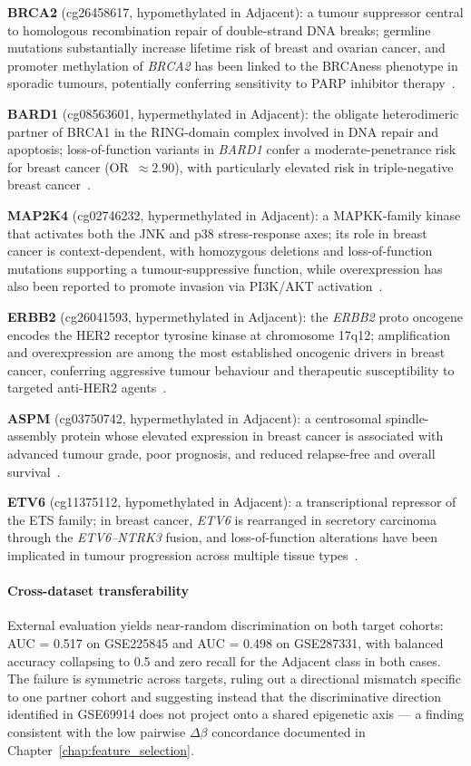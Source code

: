 \textbf{BRCA2} (cg26458617, hypomethylated in Adjacent): a tumour suppressor
central to homologous recombination repair of double-strand DNA breaks;
germline mutations substantially increase lifetime risk of breast and ovarian
cancer, and promoter methylation of \textit{BRCA2} has been linked to the
BRCAness phenotype in sporadic tumours, potentially conferring sensitivity to
PARP inhibitor therapy~\cite{kalachand2024brca}.

\textbf{BARD1} (cg08563601, hypermethylated in Adjacent): the obligate
heterodimeric partner of BRCA1 in the RING-domain complex involved in DNA
repair and apoptosis; loss-of-function variants in \textit{BARD1} confer a
moderate-penetrance risk for breast cancer (OR~$\approx 2.90$), with
particularly elevated risk in triple-negative breast
cancer~\cite{graffeo2022bard1}.

\textbf{MAP2K4} (cg02746232, hypermethylated in Adjacent): a MAPKK-family
kinase that activates both the JNK and p38 stress-response axes; its role in
breast cancer is context-dependent, with homozygous deletions and
loss-of-function mutations supporting a tumour-suppressive function, while
overexpression has also been reported to promote invasion via PI3K/AKT
activation~\cite{liu2019map2k4}.

\textbf{ERBB2} (cg26041593, hypermethylated in Adjacent): the \textit{ERBB2}
proto oncogene encodes the HER2 receptor tyrosine kinase at chromosome 17q12;
amplification and overexpression are among the most established oncogenic
drivers in breast cancer, conferring aggressive tumour behaviour and
therapeutic susceptibility to targeted anti-HER2
agents~\cite{moasser2007her2}.

\textbf{ASPM} (cg03750742, hypermethylated in Adjacent): a centrosomal
spindle-assembly protein whose elevated expression in breast cancer is
associated with advanced tumour grade, poor prognosis, and reduced
relapse-free and overall survival~\cite{tang2019aspm}.

\textbf{ETV6} (cg11375112, hypomethylated in Adjacent): a transcriptional
repressor of the ETS family; in breast cancer, \textit{ETV6} is rearranged in
secretory carcinoma through the \textit{ETV6--NTRK3} fusion, and
loss-of-function alterations have been implicated in tumour progression across
multiple tissue types~\cite{tognon2002etv6}.

\paragraph{Cross-dataset transferability}
External evaluation yields near-random discrimination on both target cohorts:
AUC = 0.517 on GSE225845 and AUC = 0.498 on GSE287331, with balanced
accuracy collapsing to 0.5 and zero recall for the Adjacent class in both
cases. The failure is symmetric across targets, ruling out a directional
mismatch specific to one partner cohort and suggesting instead that the
discriminative direction identified in GSE69914 does not project onto a
shared epigenetic axis --- a finding consistent with the low pairwise
$\Delta\beta$ concordance documented in Chapter~\ref{chap:feature_selection}.

